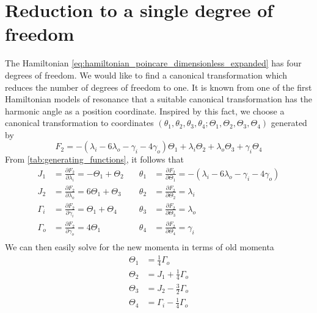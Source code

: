 \documentclass[ twoside,openright,titlepage,numbers=noenddot,headinclude,%
                footinclude=true,cleardoublepage=empty,abstractoff, %
                BCOR=5mm,paper=a4,fontsize=11pt,%
                american,%
                ]{scrreprt}
\begin{document}
\section{Reduction to a single degree of freedom}
\label{sec:Reduction_to_a_sdof}
The Hamiltonian \ref{eq:hamiltonian_poincare_dimensionless_expanded} has four
degrees of freedom. We would like to find a canonical transformation which
reduces the number of degrees of freedom to one. It is known from one of the 
first Hamiltonian models of resonance \citep{Henrard1983} that a suitable 
canonical transformation has the harmonic angle as a position coordinate.
Inspired by this fact, we choose a canonical transformation to coordinates
$(\theta_1,\theta_2,\theta_3,\theta_4;\Theta_1,\Theta_2,\Theta_3,\Theta_4)$ 
generated by
\begin{equation}
    F_2= -(\lambda_i-6\lambda_o -\gamma_i - 4\gamma_o)\Theta_1 + 
    \lambda_i\Theta_2+ \lambda_o\Theta_3+\gamma_i\Theta_4
\end{equation}
From \cref{tab:generating_functions}, it follows that 
\begin{equation}
    \begin{aligned}
        J_1&= \frac{\partial F_2}{\partial \lambda_i}=-\Theta_1+\Theta_2 & 
        \quad\theta_1&= \frac{\partial F_2}{\partial\Theta_1}=
        - (\lambda_i-6\lambda_o -\gamma_i - 4\gamma_o)\\
J_2&= \frac{\partial F_2}{\partial \lambda_o}=6\Theta_1+\Theta_3 & 
        \quad\theta_2&= \frac{\partial F_2}{\partial\Theta_2}=\lambda_i\\
\Gamma_i&= \frac{\partial F_2}{\partial \gamma_i}=\Theta_1+\Theta_4& 
        \quad\theta_3&= \frac{\partial F_2}{\partial\Theta_3}=\lambda_o\\
\Gamma_o&= \frac{\partial F_2}{\partial \gamma_o}=4\Theta_1& 
        \quad\theta_4&= \frac{\partial F_2}{\partial\Theta_4}=\gamma_i\\
    \end{aligned}
    \label{eq:new_momenta}
\end{equation}
We can then easily solve for the new momenta in terms of old momenta
\begin{equation}
    \begin{aligned}
        \Theta_1&= \frac{1}{4} \Gamma_o\\
        \Theta_2&=J_1+ \frac{1}{4} \Gamma_o\\
        \Theta_3&=J_2 - \frac{3}{2} \Gamma_o\\
        \Theta_4&= \Gamma_i - \frac{1}{4} \Gamma_o
    \end{aligned}
\end{equation}
\end{document}
